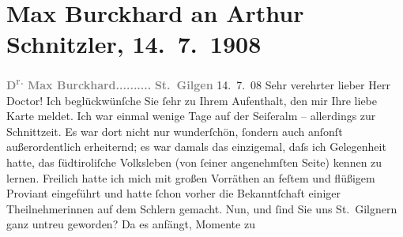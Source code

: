 

         
         \renewcommand{\erwaehntePersonen}{Personen: Max Eugen Burckhard, Olga Schnitzler}
         \renewcommand{\erwaehnteOrte}{Orte: Porzellangasse, Schlern, Seis am Schlern, Seiser Alm, St. Gilgen, Südtirol}
         \renewcommand{\erwaehnteWerke}{}
               \section[Max Burckhard an Arthur Schnitzler, 14. 7. 1908]{ Max Burckhard an Arthur Schnitzler, 14. 7. 1908}\nopagebreak{}\rehead{ }\begin{ledgroupsized}[t]{13cm}\normalsize\beginnumbering{} \toendnotes[C]{\smallbreak\pagebreak[2]} 
\toendnotes[C]{\smallbreak}\pstart
           \noindent{}{\pb}\textcolor{gray}{\textbf{D\textsuperscript{r.} Max Burckhard}}\hfill \textcolor{gray}{\textbf{..........}}\pend
           \pstart
           \raggedleft{}\textcolor{gray}{\textbf{St. Gilgen}}{ }14. 7. 08\pend
           \pstart{}Sehr verehrter lieber Herr Doctor!\pend\pstart
           Ich beglückwünſche Sie ſehr  zu Ihrem Aufenthalt,
               den mir Ihre liebe Karte meldet. Ich war einmal wenige Tage auf der Seiſeralm – allerdings zur Schnittzeit. Es war
               dort nicht nur wunderſchön, ſondern auch anſonſt außerordentlich erheiternd; es war
               damals das einzigemal, daſs ich Gelegenheit hatte, das ſüdtiroliſche Volksleben (von ſeiner angenehmſten Seite) kennen zu lernen.
               Freilich hatte ich mich mit großen Vorräthen an feſtem und flüßigem Proviant
               eingeführt und hatte ſchon vorher die Bekanntſchaft einiger Theilnehmerinnen auf dem{ }Schlern gemacht.\pend
           \pstart
           {\pb}Nun, und ſind Sie uns St. Gilgnern ganz untreu geworden? Da es anfängt, Momente zu

\end{ledgroupsized}
